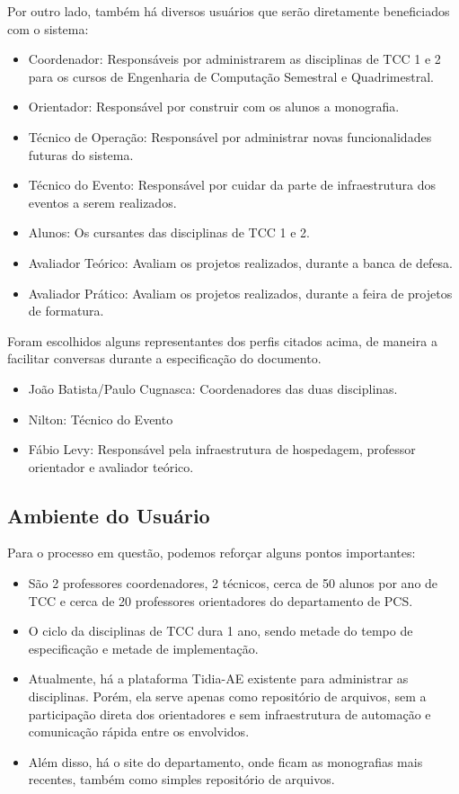 Por outro lado, também há diversos usuários que serão diretamente beneficiados com o sistema:

\begin{itemize}
    \item Coordenador: Responsáveis por administrarem as disciplinas de TCC 1 e 2 para os cursos de Engenharia de Computação Semestral e Quadrimestral.
    \item Orientador: Responsável por construir com os alunos a monografia.
    \item Técnico de Operação: Responsável por administrar novas funcionalidades futuras do sistema.
    \item Técnico do Evento: Responsável por cuidar da parte de infraestrutura dos eventos a serem realizados.
    \item Alunos: Os cursantes das disciplinas de TCC 1 e 2.
    \item Avaliador Teórico: Avaliam os projetos realizados, durante a banca de defesa.
    \item Avaliador Prático: Avaliam os projetos realizados, durante a feira de projetos de formatura.
\end{itemize}

Foram escolhidos alguns representantes dos perfis citados acima, de maneira a facilitar conversas durante a especificação do documento.

\begin{itemize}
    \item João Batista/Paulo Cugnasca: Coordenadores das duas disciplinas.
    \item Nilton: Técnico do Evento
    \item Fábio Levy: Responsável pela infraestrutura de hospedagem, professor orientador e avaliador teórico.
\end{itemize}

\subsection{Ambiente do Usuário}
Para o processo em questão, podemos reforçar alguns pontos importantes:

\begin{itemize}
    \item São 2 professores coordenadores, 2 técnicos, cerca de 50 alunos por ano de TCC e cerca de 20 professores orientadores do departamento de PCS.
    \item O ciclo da disciplinas de TCC dura 1 ano, sendo metade do tempo de especificação e metade de implementação.
    \item Atualmente, há a plataforma Tidia-AE existente para administrar as disciplinas. Porém, ela serve apenas como repositório de arquivos, sem a participação direta dos orientadores e sem infraestrutura de automação e comunicação rápida entre os envolvidos.
    \item Além disso, há o site do departamento, onde ficam as monografias mais recentes, também como simples repositório de arquivos.
\end{itemize}


